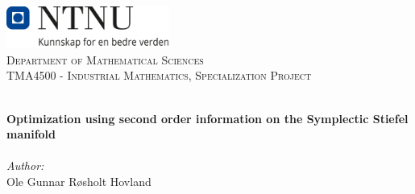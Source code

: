 
\begin{titlepage}
\vbox{ }
\vbox{ }
\begin{center}
\includegraphics[width=0.40\textwidth]{Images/NTNU_logo.png}\\[1cm]
\textsc{\LARGE Department of Mathematical Sciences}\\[1.5cm]
\textsc{\Large TMA4500 - Industrial Mathematics, Specialization Project }\\[0.5cm]
\vbox{ }

\HRule \\[0.4cm]
{ \huge \bfseries Optimization using second order information on the Symplectic Stiefel manifold}\\[0.4cm]
\HRule \\[1.5cm]

\large
\emph{Author:}\\
Ole Gunnar Røsholt Hovland
\vfill

\end{center}
\end{titlepage}